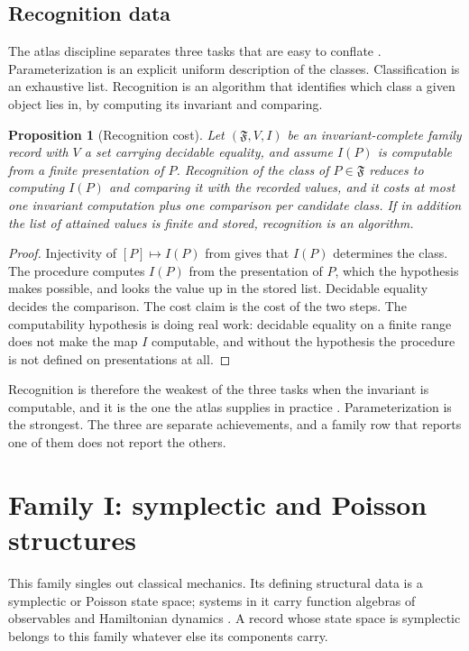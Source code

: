 \documentclass[11pt,letterpaper]{article}
\newtheorem{proposition}[theorem]{Proposition}
\theoremstyle{definition}
\theoremstyle{remark}
\begin{document}
\subsection{Recognition data}
\label{sec:recognition}

The atlas discipline separates three tasks that are easy to conflate \cite{atlas}. Parameterization is an explicit uniform description of the classes. Classification is an exhaustive list. Recognition is an algorithm that identifies which class a given object lies in, by computing its invariant and comparing.

\begin{proposition}[Recognition cost]
\label{prop:recognition-cost}
Let $(\mathfrak{F}, V, I)$ be an invariant-complete family record with $V$ a set carrying decidable equality, and assume $I(P)$ is computable from a finite presentation of $P$. Recognition of the class of $P \in \mathfrak{F}$ reduces to computing $I(P)$ and comparing it with the recorded values, and it costs at most one invariant computation plus one comparison per candidate class. If in addition the list of attained values is finite and stored, recognition is an algorithm.
\end{proposition}

\begin{proof}
Injectivity of $[P] \mapsto I(P)$ from  gives that $I(P)$ determines the class. The procedure computes $I(P)$ from the presentation of $P$, which the hypothesis makes possible, and looks the value up in the stored list. Decidable equality decides the comparison. The cost claim is the cost of the two steps. The computability hypothesis is doing real work: decidable equality on a finite range does not make the map $I$ computable, and without the hypothesis the procedure is not defined on presentations at all.
\end{proof}

Recognition is therefore the weakest of the three tasks when the invariant is computable, and it is the one the atlas supplies in practice \cite{atlas}. Parameterization is the strongest. The three are separate achievements, and a family row that reports one of them does not report the others.

\section{Family I: symplectic and Poisson structures}
\label{sec:family1}

This family singles out classical mechanics. Its defining structural data is a symplectic or Poisson state space; systems in it carry function algebras of observables and Hamiltonian dynamics \cite{poisson}. A record whose state space is symplectic belongs to this family whatever else its components carry.
\end{document}
